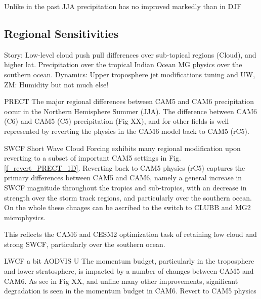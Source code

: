 Unlike in the past JJA precipitation has no improved markedly than in DJF



\subsection{Regional Sensitivities}
Story: Low-level cloud push pull differences over sub-topical regions (Cloud), and higher lat. Precipitation over the tropical Indian Ocean
MG physics over the southern ocean. Dynamics: Upper troposphere jet modifications tuning and UW, ZM: Humidity but not much else!

PRECT
The major regional differences between CAM5 and CAM6 precipitation occur in the Northern Hemisphere Summer (JJA). The difference between CAM6 (C6) and CAM5 (C5) precipitation (Fig XX), and for other fields is well represented by reverting the physics in the CAM6 model back to CAM5 (rC5).


SWCF
Short Wave Cloud Forcing exhibits many regional modification upon reverting to a subset of important CAM5 settings in Fig. \ref{f_revert_PRECT_1D}. Reverting back to CAM5 physics (rC5) captures the primary differences between CAM5 and CAM6, namely a general increase in SWCF magnitude throughout the tropics and sub-tropics, with an decrease in strength over the storm track regions, and particularly over the southern ocean. On the whole these chnages can be ascribed to the switch to CLUBB and MG2 microphysics. 

This reflects the CAM6 and CESM2 optimization task of retaining low cloud and strong SWCF, particularly over the southern ocean.

LWCF a bit
AODVIS
U
The momentum budget, particularly in the troposphere and lower stratosphere, is impacted by a number of changes between CAM5 and CAM6. As see in Fig XX, and unline many other improvements, significant degradation is seen in the momentum budget in CAM6. Revert to CAM5 physics 